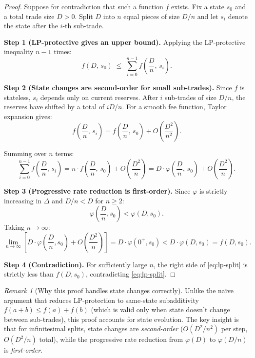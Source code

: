 \documentclass[11pt]{article}
\theoremstyle{definition}
\theoremstyle{remark}
\newtheorem{remark}[theorem]{Remark}
\begin{document}
\begin{proof}
Suppose for contradiction that such a function $f$ exists.
Fix a state $s_0$ and a total trade size $D>0$.
Split $D$ into $n$ equal pieces of size $D/n$ and let $s_i$ denote the state after the $i$-th sub-trade.

\medskip\noindent
\textbf{Step 1 (LP-protective gives an upper bound).}
Applying the LP-protective inequality $n-1$ times:
\begin{equation}\label{eq:lp-split}
f(D,\,s_0) \;\le\; \sum_{i=0}^{n-1} f\!\left(\frac{D}{n},\,s_i\right).
\end{equation}

\medskip\noindent
\textbf{Step 2 (State changes are second-order for small sub-trades).}
Since $f$ is stateless, $s_i$ depends only on current reserves.
After $i$ sub-trades of size $D/n$, the reserves have shifted by a total of $iD/n$.
For a smooth fee function, Taylor expansion gives:
\[
f\!\left(\frac{D}{n},\,s_i\right) = f\!\left(\frac{D}{n},\,s_0\right) + O\!\left(\frac{D^2}{n^2}\right).
\]

Summing over $n$ terms:
\[
\sum_{i=0}^{n-1} f\!\left(\frac{D}{n},\,s_i\right) = n\cdot f\!\left(\frac{D}{n},\,s_0\right) + O\!\left(\frac{D^2}{n}\right)
= D\cdot\varphi\!\left(\frac{D}{n},\,s_0\right) + O\!\left(\frac{D^2}{n}\right).
\]

\medskip\noindent
\textbf{Step 3 (Progressive rate reduction is first-order).}
Since $\varphi$ is strictly increasing in $\Delta$ and $D/n < D$ for $n\ge 2$:
\[
\varphi\!\left(\frac{D}{n},s_0\right) < \varphi(D,s_0).
\]
Taking $n\to\infty$:
\[
\lim_{n\to\infty}\left[D\cdot\varphi\!\left(\frac{D}{n},s_0\right) + O\!\left(\frac{D^2}{n}\right)\right]
= D\cdot\varphi(0^+,s_0) < D\cdot\varphi(D,s_0) = f(D,s_0).
\]

\medskip\noindent
\textbf{Step 4 (Contradiction).}
For sufficiently large $n$, the right side of \eqref{eq:lp-split} is strictly less than $f(D,s_0)$, contradicting \eqref{eq:lp-split}.
\end{proof}

\begin{remark}[Why this proof handles state changes correctly]
Unlike the na\"ive argument that reduces LP-protection to same-state subadditivity $f(a+b)\le f(a)+f(b)$ (which is valid only when state doesn't change between sub-trades), this proof accounts for state evolution.
The key insight is that for infinitesimal splits, state changes are \emph{second-order} ($O(D^2/n^2)$ per step, $O(D^2/n)$ total), while the progressive rate reduction from $\varphi(D)$ to $\varphi(D/n)$ is \emph{first-order}.
\end{remark}
\end{document}
